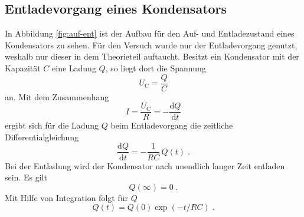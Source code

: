 \subsection{Entladevorgang eines Kondensators}
In Abbildung \ref{fig:auf-ent} ist der Aufbau für den Auf- und Entladezustand eines Kondensators zu sehen.
Für den Versuch wurde nur der Entladevorgang genutzt, weshalb nur dieser in dem Theorieteil auftaucht.
Besitzt ein Kondensator mit der Kapazität $C$ eine Ladung $Q$, so liegt dort die Spannung 
\begin{equation*}
    U_\text{C}=\frac{Q}{C}
\end{equation*}
an. Mit dem Zusammenhang
\begin{equation*}
    I=\frac{U_\text{C}}{R}=- \frac{\text{d}Q}{\text{d}t}
\end{equation*}
ergibt sich für die Ladung $Q$ beim Entladevorgang die zeitliche Differentialgleichung
\begin{equation}
    \label{eqn:Q-DGL}
    \frac{\text{d}Q}{\text{d}t}=-\frac{1}{RC}\,Q(t)\; \text{.}
\end{equation}
Bei der Entladung wird der Kondensator nach unendlich langer Zeit entladen sein. Es gilt
\begin{equation*}
    Q(\infty)=0\; \text{.}
\end{equation*}
Mit Hilfe von Integration folgt für $Q$
\begin{equation}
    Q(t)=Q(0)\exp(-t/RC)\; \text{.} \label{eqn:Charge}
\end{equation}
